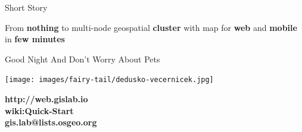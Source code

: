 \documentclass[12pt]{beamer}
\begin{document}
\begin{frame}{Short Story}
	\begin{center}
		From \textbf{nothing} to multi-node geospatial \textbf{cluster} with map for \textbf{web} and \textbf{mobile} in \textbf{few minutes}
	\end{center}
\end{frame}

\begin{frame}[plain]{Good Night And Don't Worry About Pets}
	\begin{center}
		\texttt{[image: images/fairy-tail/dedusko-vecernicek.jpg]}
	\end{center}
\end{frame}

\begin{frame}[plain]
	\begin{center}
		\textbf{http://web.gislab.io}\\
		\textbf{wiki:Quick-Start}\\
		\textbf{gis.lab@lists.osgeo.org}
	\end{center}
\end{frame}


\end{document}
